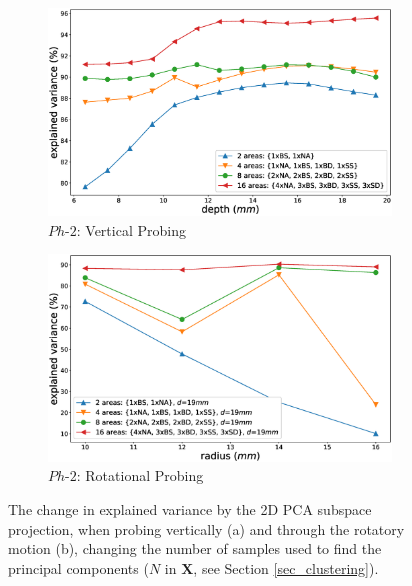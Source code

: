 \begin{figure}[]
\centering
\begin{subfigure}[b]{.48\textwidth}
	\includegraphics[width=\textwidth]{./figs/explained_variance_vertical_quantity.eps}
	\caption{$Ph\text{-}2$: Vertical Probing}
	\label{inf_retention_quantity:vertical}
\end{subfigure}
\begin{subfigure}[b]{.48\textwidth}
	\includegraphics[width=\textwidth]{./figs/explained_variance_rotation_quantity.eps}
	\caption{$Ph\text{-}2$: Rotational Probing}
	\label{inf_retention_quantity:rotation}
\end{subfigure}
\caption{The change in explained variance by the 2D PCA subspace projection, when 
	probing vertically (a) and through the rotatory motion (b), changing the number of samples used 
	to find the principal components ($N$ in $\mathbf{X}$, see Section \ref{sec_clustering}). }
\label{inf_retention_quantity}
\end{figure}

